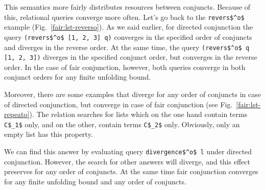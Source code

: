 This semantics more fairly distributes resources between conjuncts. Because of this, relational queries converge more often. Let's go back to the \lstinline{revers$^o$} example
(Fig.~\ref{fair:lst-reverso}). As we said earlier, for directed conjunction the query \lstinline{(revers$^o$ [1, 2, 3] q)} converges in the specified order of conjuncts and diverges
in the reverse order. At the same time, the query \lstinline{(revers$^o$ q [1, 2, 3])} diverges in the specified conjunct order, but converges in the reverse order. In the case of fair conjunction,
however, both queries converge in both conjunct orders for any finite unfolding bound. 

Moreover, there are some examples that diverge for any order of conjuncts in case of directed conjunction, but converge in case of fair conjunction (see Fig.~\ref{fair:lst-repeato}).
The relation searches for lists which on the one hand contain terms \lstinline{C$_1$} only, and on the other, contain terms \lstinline{C$_2$} only. Obviously, only an empty list has this property.

We can find this answer by evaluating query \lstinline{divergence$^o$ l} under directed conjunction. However, the search for other answers will diverge, and this effect preserves
for any order of conjuncts. At the same time fair conjunction converges for any finite unfolding bound and any order of conjuncts.

